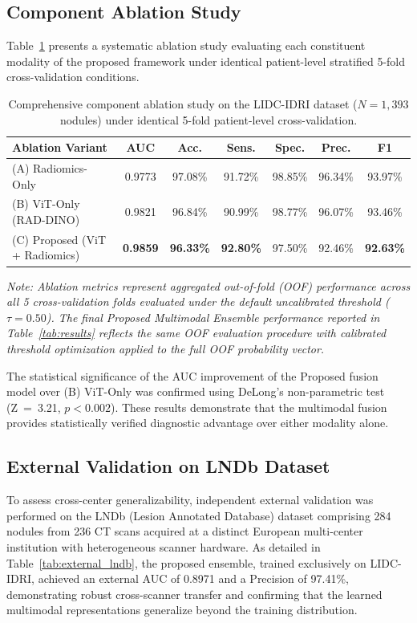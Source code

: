 \documentclass{iopjournal}
\begin{document}
\subsection{Component Ablation Study}

Table~\ref{tab:ablation} presents a systematic ablation study evaluating each
constituent modality of the proposed framework under identical patient-level
stratified 5-fold cross-validation conditions.

\begin{table}[h]
\centering
\caption{Comprehensive component ablation study on the LIDC-IDRI dataset ($N=1{,}393$ nodules) under identical 5-fold patient-level cross-validation.}\label{tab:ablation}
\begin{tabular}{lcccccc}
\toprule
\textbf{Ablation Variant} & \textbf{AUC} & \textbf{Acc.} & \textbf{Sens.} &
\textbf{Spec.} & \textbf{Prec.} & \textbf{F1} \\
\midrule
(A) Radiomics-Only & 0.9773 & 97.08\% & 91.72\% & 98.85\% & 96.34\% & 93.97\% \\
(B) ViT-Only (RAD-DINO) & 0.9821 & 96.84\% & 90.99\% & 98.77\% & 96.07\% & 93.46\% \\
(C) Proposed (ViT + Radiomics) & \textbf{0.9859} & \textbf{96.33\%} &
\textbf{92.80\%} & 97.50\% & 92.46\% & \textbf{92.63\%} \\
\bottomrule
\end{tabular}
\end{table}

\noindent\textit{Note: Ablation metrics represent aggregated out-of-fold (OOF)
performance across all 5 cross-validation folds evaluated under the default
uncalibrated threshold ($\tau = 0.50$). The final Proposed Multimodal
Ensemble performance reported in Table~\ref{tab:results} reflects the same OOF
evaluation procedure with calibrated threshold optimization applied to the full OOF
probability vector.}

The statistical significance of the AUC improvement of the Proposed fusion
model over (B) ViT-Only was confirmed using DeLong's non-parametric test
(Z~=~3.21, $p < 0.002$). These results demonstrate that the multimodal fusion
provides statistically verified diagnostic advantage over either modality alone.

\subsection{External Validation on LNDb Dataset}

To assess cross-center generalizability, independent external validation was
performed on the LNDb (Lesion Annotated Database) dataset comprising 284
nodules from 236 CT scans acquired at a distinct European multi-center
institution with heterogeneous scanner hardware. As detailed in
Table~\ref{tab:external_lndb}, the proposed ensemble, trained exclusively on
LIDC-IDRI, achieved an external AUC of 0.8971 and a Precision of 97.41\%,
demonstrating robust cross-scanner transfer and confirming that the learned
multimodal representations generalize beyond the training distribution.
\end{document}
